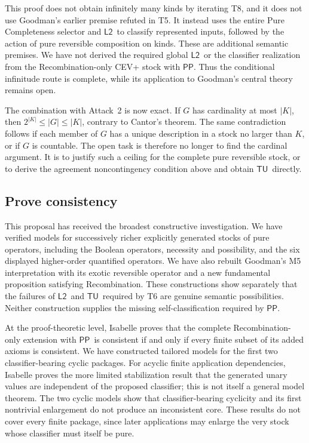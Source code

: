 \documentclass[12pt,leqno]{article}
\theoremstyle{plain}
\theoremstyle{definition}
\newcommand{\PP}{\ensuremath{\mathsf{PP}}}
\newcommand{\Ltwo}{\ensuremath{\mathsf{L2}}}
\newcommand{\TU}{\ensuremath{\mathsf{TU}}}
\begin{document}
This proof does not obtain infinitely many kinds by iterating T8, and it does
not use Goodman's earlier premise refuted in T5.  It instead uses the entire
Pure Completeness selector and \Ltwo\ to classify represented inputs, followed
by the action of pure reversible composition on kinds.  These are additional
semantic premises.  We have not derived the required global \Ltwo\ or the
classifier realization from the Recombination-only CEV+ stock with \PP.
Thus the conditional infinitude route is complete, while its application to
Goodman's central theory remains open.

The combination with Attack~2 is now exact.  If \(G\) has cardinality at most
\(|K|\), then \(2^{|K|}\leq |G|\leq |K|\), contrary to Cantor's theorem.  The
same contradiction follows if each member of \(G\) has a unique description
in a stock no larger than \(K\), or if \(G\) is countable.  The open task is
therefore no longer to find the cardinal argument.  It is to justify such a
ceiling for the complete pure reversible stock, or to derive the agreement
noncontingency condition above and obtain \TU\ directly.

\subsection{Prove consistency}

This proposal has received the broadest constructive investigation.  We
have verified models for successively richer explicitly generated stocks of
pure operators, including the Boolean operators, necessity and possibility,
and the six displayed higher-order quantified operators.  We have also rebuilt
Goodman's M5 interpretation with its exotic reversible operator and a new
fundamental proposition satisfying Recombination.  These constructions show
separately that the failures of \Ltwo\ and \TU\ required by T6 are genuine
semantic possibilities.  Neither construction supplies the missing
self-classification required by \PP.

At the proof-theoretic level, Isabelle proves that the complete
Recombination-only extension with \PP\ is consistent if and only if every
finite subset of its added axioms is consistent.  We have constructed
tailored models for the first two classifier-bearing cyclic packages.  For
acyclic finite application dependencies, Isabelle proves the more limited
stabilization result that the generated unary values are independent of the
proposed classifier; this is not itself a general model theorem.  The two
cyclic models show that classifier-bearing cyclicity and its first
nontrivial enlargement do not produce an inconsistent core.  These results
do not cover every finite package, since later applications may enlarge the
very stock whose classifier must itself be pure.
\end{document}
